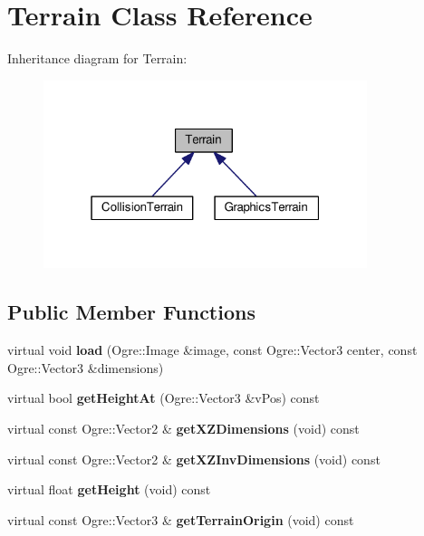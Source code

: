\hypertarget{class_terrain}{}\section{Terrain Class Reference}
\label{class_terrain}


Inheritance diagram for Terrain\+:\nopagebreak
\begin{figure}[H]
\begin{center}
\leavevmode
\includegraphics[width=268pt]{class_terrain__inherit__graph}
\end{center}
\end{figure}
\subsection*{Public Member Functions}
\begin{DoxyCompactItemize}
\item 
\mbox{\label{class_terrain_a8f77d3aac1e178496309536f980c27fe}} 
virtual void {\bfseries load} (Ogre\+::\+Image \&image, const Ogre\+::\+Vector3 center, const Ogre\+::\+Vector3 \&dimensions)
\item 
\mbox{\label{class_terrain_a02b19ca469ed94b895ceadfc526203c3}} 
virtual bool {\bfseries get\+Height\+At} (Ogre\+::\+Vector3 \&v\+Pos) const
\item 
\mbox{\label{class_terrain_a5802486dd915b658773e292f797fd72b}} 
virtual const Ogre\+::\+Vector2 \& {\bfseries get\+X\+Z\+Dimensions} (void) const
\item 
\mbox{\label{class_terrain_a65bec8a0b02007377f8f7432645d9290}} 
virtual const Ogre\+::\+Vector2 \& {\bfseries get\+X\+Z\+Inv\+Dimensions} (void) const
\item 
\mbox{\label{class_terrain_a9a99a3fd62c958faea6cc07f0e23e8d9}} 
virtual float {\bfseries get\+Height} (void) const
\item 
\mbox{\label{class_terrain_a22b6a113ff0f3bd7ff43b9d2fb201a68}} 
virtual const Ogre\+::\+Vector3 \& {\bfseries get\+Terrain\+Origin} (void) const
\end{DoxyCompactItemize}
